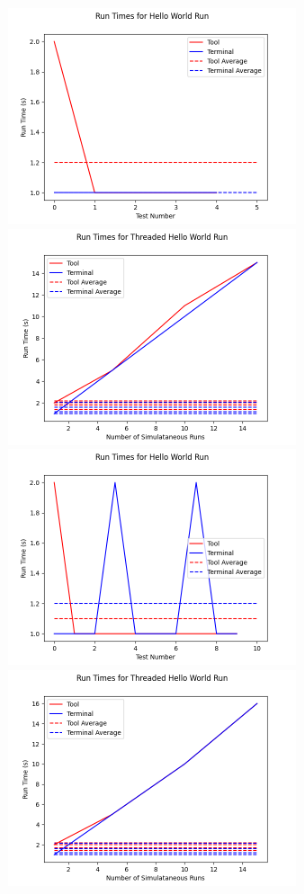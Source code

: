\begin{figure}[h!]
  \centering
  \includegraphics[width=3in]{images/evaluation/run5/hello-world}
  \includegraphics[width=3in]{images/evaluation/run5/thread-hello-world}
  \includegraphics[width=3in]{images/evaluation/run6/hello-world}
  \includegraphics[width=3in]{images/evaluation/run6/thread-hello-world}

\end{figure}

